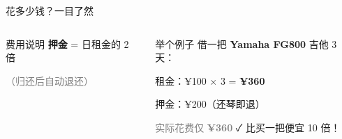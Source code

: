 \documentclass[aspectratio=169,10pt]{beamer}
\newcommand{\good}[1]{\textcolor{success}{#1}}
\newcommand{\price}[1]{\textcolor{warm}{#1}}
\newcommand{\dimtext}[1]{\textcolor{gray}{#1}}
\begin{document}
\begin{frame}{花多少钱？一目了然}
\begin{columns}[T]
\begin{block}{费用说明}
      \vspace{4pt}
      \textbf{押金} = 日租金的 2 倍

      \vspace{4pt}
      \dimtext{（归还后自动退还）}
    \end{block}

    \vspace{8pt}
    \begin{exampleblock}{举个例子}
      {\small 借一把 \textbf{Yamaha FG800} 吉他 3 天：}

      \vspace{4pt}
      {\large 租金：\price{¥100} × 3 = \price{\textbf{¥360}}}

      \vspace{4pt}
      {\large 押金：\price{¥200}（还琴即退）}

      \vspace{4pt}
      {\normalsize \dimtext{实际花费仅 \price{\textbf{¥360}}}
       \quad \good{✓} 比买一把便宜 10 倍！}
    \end{exampleblock}
  \end{columns}
\end{frame}
\end{document}

